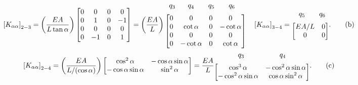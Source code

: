 \documentclass{AeroStructure-ERJohnson}
\begin{document}
\begin{example*}
\begin{gather}
\left[K_{\alpha \alpha}\right]_{2-3}=\left(\frac{E A}{L \tan \alpha}\right)\left[\begin{array}{@{}cccc@{}}0 & 0 & 0 & 0 \\0 & 1 & 0 & -1 \\0 & 0 & 0 & 0 \\0 & -1 & 0 & 1\end{array}\right]=\left(\frac{E A}{L}\right)\begin{array}{@{}c@{}}{\arraycolsep=7.5pt\begin{array}{@{}cccc@{}}q_{3}\phantom{.} & q_{4}\phantom{0} & q_{5}\phantom{0} & q_{6}\phantom{00} \end{array}}\\[6pt]\left[\begin{array}{@{}cccc@{}}0 & 0 & 0 & 0 \\0 & \cot \alpha & 0 & -\cot \alpha \\0 & 0 & 0 & 0 \\0 & -\cot \alpha & 0 & \cot \alpha\end{array}\right]\end{array}\quad \left[K_{\alpha \alpha}\right]_{3-4}=\begin{array}{@{}c@{}}\begin{array}{@{}cc@{}}\phantom{0}q_{5} & \phantom{00}q_{6} \end{array}\\[6pt]\left[\begin{array}{@{}cc@{}}E A / L & 0 \\0 & 0\end{array}\right]\end{array}.\label{eq16.4b}\tag{b}\\
\left[K_{\alpha \alpha}\right]_{2-4}=\left(\frac{E A}{L /(\cos \alpha)}\right)\left[\begin{array}{@{}cc@{}}\cos ^{2} \alpha & -\cos \alpha \sin \alpha \\-\cos \alpha \sin \alpha & \sin ^{2} \alpha\end{array}\right]=\frac{E A}{L}\begin{array}{@{}c@{}}\begin{array}{@{}cc@{}}q_{3}\phantom{0000} & \phantom{0000}q_{4} \end{array}\\[6pt]\left[\begin{array}{@{}cc@{}}\cos ^{3} \alpha & -\cos ^{2} \alpha \sin \alpha \\-\cos ^{2} \alpha \sin \alpha & \cos \alpha \sin ^{2} \alpha\end{array}\right]\end{array}.\label{eq16.4c}\tag{c}

\end{gather}
\end{example*}
\end{document}
